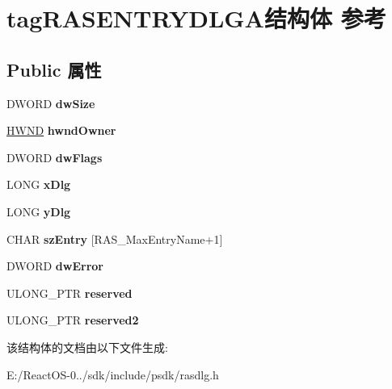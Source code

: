 \hypertarget{structtag_r_a_s_e_n_t_r_y_d_l_g_a}{}\section{tag\+R\+A\+S\+E\+N\+T\+R\+Y\+D\+L\+G\+A结构体 参考}
\label{structtag_r_a_s_e_n_t_r_y_d_l_g_a}
\subsection*{Public 属性}
\begin{DoxyCompactItemize}
\item 
\mbox{\label{structtag_r_a_s_e_n_t_r_y_d_l_g_a_a27007ffa639b6745a9484101f0f77fa2}} 
D\+W\+O\+RD {\bfseries dw\+Size}
\item 
\mbox{\label{structtag_r_a_s_e_n_t_r_y_d_l_g_a_af5efa12159d42d342a4e5b4d8d8f650d}} 
\hyperlink{interfacevoid}{H\+W\+ND} {\bfseries hwnd\+Owner}
\item 
\mbox{\label{structtag_r_a_s_e_n_t_r_y_d_l_g_a_a21ddfd0b79bc7b5d18744f17db84f39e}} 
D\+W\+O\+RD {\bfseries dw\+Flags}
\item 
\mbox{\label{structtag_r_a_s_e_n_t_r_y_d_l_g_a_a0dc7796d861a990c919bd3c8ac6b1036}} 
L\+O\+NG {\bfseries x\+Dlg}
\item 
\mbox{\label{structtag_r_a_s_e_n_t_r_y_d_l_g_a_ad563cfdd62f0ed79aa68807fd154b6f6}} 
L\+O\+NG {\bfseries y\+Dlg}
\item 
\mbox{\label{structtag_r_a_s_e_n_t_r_y_d_l_g_a_aa38804749fb2b14a19130de832183770}} 
C\+H\+AR {\bfseries sz\+Entry} \mbox{[}R\+A\+S\+\_\+\+Max\+Entry\+Name+1\mbox{]}
\item 
\mbox{\label{structtag_r_a_s_e_n_t_r_y_d_l_g_a_af767d06f48a96bbf7d8e78ae7a817eec}} 
D\+W\+O\+RD {\bfseries dw\+Error}
\item 
\mbox{\label{structtag_r_a_s_e_n_t_r_y_d_l_g_a_ac68253137a796f223fbb6823ba631cd5}} 
U\+L\+O\+N\+G\+\_\+\+P\+TR {\bfseries reserved}
\item 
\mbox{\label{structtag_r_a_s_e_n_t_r_y_d_l_g_a_ab86636752b204e4e14fc0f7b08f3926c}} 
U\+L\+O\+N\+G\+\_\+\+P\+TR {\bfseries reserved2}
\end{DoxyCompactItemize}


该结构体的文档由以下文件生成\+:\begin{DoxyCompactItemize}
\item 
E\+:/\+React\+O\+S-\/0../sdk/include/psdk/rasdlg.\+h\end{DoxyCompactItemize}
